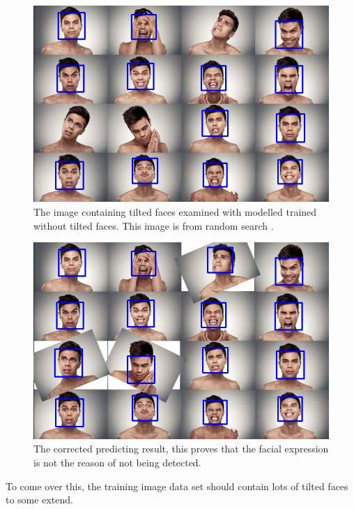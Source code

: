 \documentclass[10pt,twocolumn,letterpaper]{article}
\begin{document}
\begin{figure}[t]
    \begin{center}
        \includegraphics[width=0.9\linewidth]{facial1}
    \end{center}
    \caption{The image containing tilted faces examined with modelled trained without tilted faces. This image is from random search \cite{facialimg}.}
    \label{fig:tilt}
\end{figure}

\begin{figure}[t]
    \begin{center}
        \includegraphics[width=0.9\linewidth]{facial1_corrected}
    \end{center}
    \caption{The corrected predicting result, this proves that the facial expression is not the reason of not being detected.}
    \label{fig:tiltcor}
\end{figure}

To come over this, the training image data set should contain lots of tilted faces to some extend.
\end{document}
